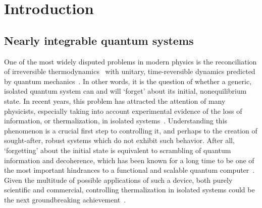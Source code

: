 \chapter{Introduction\label{chap:intro}}
\thispagestyle{chapterBeginStyle}

\section{Nearly integrable quantum systems}
One of the most widely disputed problems in modern physics is the reconciliation
of irreversible thermodynamics~\autocite{Huang1987,Feynman2018}
with unitary, time-reversible dynamics predicted by quantum mechanics~\autocite{Landau1976, Sakurai2017}.
In other words, it is the question of whether a generic, isolated quantum system can and will `forget' about its
initial, nonequilibrium state. In recent years, this problem has attracted the attention of many physicists,
especially taking into account experimental evidence of the loss of information, or thermalization, in isolated
systems~\autocite{Trotzky2012, Rigol2012, Rigol2008, Hung2010, Hofferberth2007}. Understanding this phenomenon is a crucial first step to
controlling it, and perhaps to the creation of sought-after, robust systems which do not exhibit such
behavior. After all, `forgetting' about the initial state is equivalent to scrambling of quantum information
and decoherence, which has been known for a long time to be one of the most important hindrances
to a functional and scalable quantum computer~\autocite{Shor1995,Lewis-Swan2019}. Given the multitude
of possible applications of such a device, both purely scientific and commercial, controlling thermalization
in isolated systems could be the next groundbreaking achievement~\autocite{MacQuarrie2020}.

